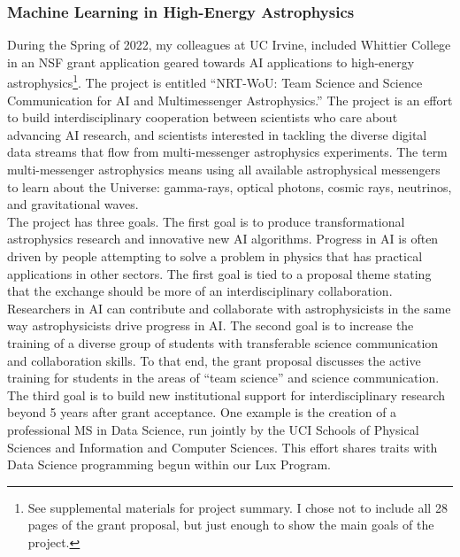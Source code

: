 \documentclass[../../../main.tex]{subfiles}
\begin{document}
\subsubsection{Machine Learning in High-Energy Astrophysics}

During the Spring of 2022, my colleagues at UC Irvine, included Whittier College in an NSF grant application geared towards AI applications to high-energy astrophysics\footnote{See supplemental materials for project summary.  I chose not to include all 28 pages of the grant proposal, but just enough to show the main goals of the project.}.  The project is entitled ``NRT-WoU: Team Science and Science Communication for AI and Multimessenger Astrophysics.''  The project is an effort to build interdisciplinary cooperation between scientists who care about advancing AI research, and scientists interested in tackling the diverse digital data streams that flow from multi-messenger astrophysics experiments.  The term multi-messenger astrophysics means using all available astrophysical messengers to learn about the Universe: gamma-rays, optical photons, cosmic rays, neutrinos, and gravitational waves.
\\
\vspace{0.25cm}
The project has three goals.  The first goal is to produce transformational astrophysics research and innovative new AI algorithms.  Progress in AI is often driven by people attempting to solve a problem in physics that has practical applications in other sectors.  The first goal is tied to a proposal theme stating that the exchange should be more of an interdisciplinary collaboration.  Researchers in AI can contribute and collaborate with astrophysicists in the same way astrophysicists drive progress in AI.  The second goal is to increase the training of a diverse group of students with transferable science communication and collaboration skills.  To that end, the grant proposal discusses the active training for students in the areas of ``team science'' and science communication.  The third goal is to build new institutional support for interdisciplinary research beyond 5 years after grant acceptance.  One example is the creation of a professional MS in Data Science, run jointly by the UCI Schools of Physical Sciences and Information and Computer Sciences.  This effort shares traits with Data Science programming begun within our Lux Program.
\\
\vspace{0.25cm}
\end{document}
